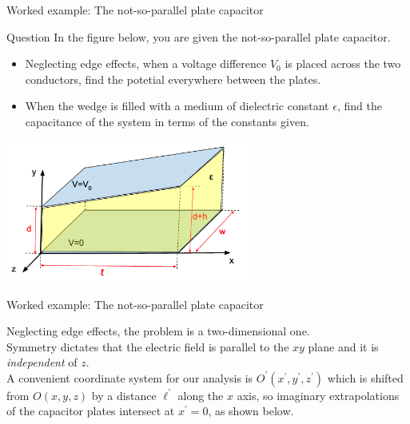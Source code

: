 
%
%

{
\problemslide

\begin{frame}{Worked example: The not-so-parallel plate capacitor}

  \begin{blockexmplque}{Question}
  In the figure below, you are given the not-so-parallel plate capacitor.
  \begin{itemize}
    \item
     Neglecting edge effects, when a voltage difference $V_0$ is placed
     across the two conductors, find the potetial everywhere between the plates.
    \item
     When the wedge is filled with a medium of dielectric constant $\epsilon$,
     find the capacitance of the system in terms of the constants given.
  \end{itemize}
  \begin{center}
    \includegraphics[width=0.60\textwidth]{./images/problems/lect4_not_so_parallel_plane_capacitor_1.png}\\
  \end{center}
  \end{blockexmplque}

\end{frame}

%
%
%

\begin{frame}{Worked example: The not-so-parallel plate capacitor}

Neglecting edge effects, the problem is a two-dimensional one.\\
\vspace{0.1cm}
Symmetry dictates that the electric field is parallel to the $xy$ plane
and it is {\em independent} of $z$.\\
\vspace{0.1cm}
A convenient coordinate system for our analysis is $O^\prime (x^\prime, y^\prime, z^\prime)$
which is shifted from $O (x, y, z)$ by a distance $\ell^\prime$ along the $x$ axis,
so imaginary extrapolations of the capacitor plates
intersect at $x^\prime=0$, as shown below.


\end{frame}}
